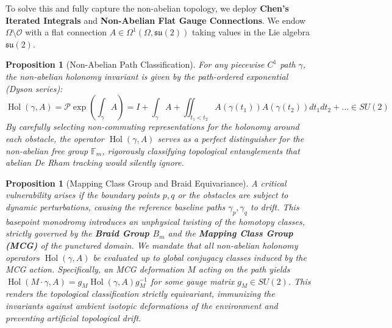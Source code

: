 \documentclass[11pt,reqno]{amsart}
\newtheorem{proposition}[theorem]{Proposition}
\theoremstyle{definition}
\numberwithin{equation}{section}
\begin{document}
To solve this and fully capture the non-abelian topology, we deploy \textbf{Chen's Iterated Integrals} \cite{chen1977} and \textbf{Non-Abelian Flat Gauge Connections}. We endow $\Omega \setminus \mathcal{O}$ with a flat connection $A \in \Omega^1(\Omega, \mathfrak{su}(2))$ taking values in the Lie algebra $\mathfrak{su}(2)$.
\begin{proposition}[Non-Abelian Path Classification]
For any piecewise $C^1$ path $\gamma$, the non-abelian holonomy invariant is given by the path-ordered exponential (Dyson series):
\begin{equation}
\operatorname{Hol}(\gamma, A) = \mathcal{P} \exp \left( \int_\gamma A \right) = I + \int_\gamma A + \iint_{t_1 < t_2} A(\gamma(t_1)) A(\gamma(t_2)) dt_1 dt_2 + \dots \in SU(2)
\end{equation}
By carefully selecting non-commuting representations for the holonomy around each obstacle, the operator $\operatorname{Hol}(\gamma, A)$ serves as a perfect distinguisher for the non-abelian free group $\mathbb{F}_m$, rigorously classifying topological entanglements that abelian De Rham tracking would silently ignore.
\end{proposition}

\begin{proposition}[Mapping Class Group and Braid Equivariance]
\label{prop:braid_equivariance}
A critical vulnerability arises if the boundary points $p, q$ or the obstacles are subject to dynamic perturbations, causing the reference baseline paths $\gamma_p, \gamma_q$ to drift. This basepoint monodromy introduces an unphysical twisting of the homotopy classes, strictly governed by the \textbf{Braid Group $B_m$} and the \textbf{Mapping Class Group (MCG)} of the punctured domain. We mandate that all non-abelian holonomy operators $\operatorname{Hol}(\gamma, A)$ be evaluated up to global conjugacy classes induced by the MCG action. Specifically, an MCG deformation $M$ acting on the path yields $\operatorname{Hol}(M \cdot \gamma, A) = g_M \operatorname{Hol}(\gamma, A) g_M^{-1}$ for some gauge matrix $g_M \in SU(2)$. This renders the topological classification strictly equivariant, immunizing the invariants against ambient isotopic deformations of the environment and preventing artificial topological drift.
\end{proposition}
\end{document}
